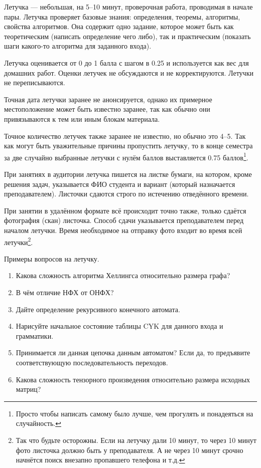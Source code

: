 Летучка --- небольшая, на 5--10 минут, проверочная работа, проводимая в начале пары. 
Летучка проверяет базовые знания: определения, теоремы, алгоритмы, свойства алгоритмов. 
Она содержит одно задание, которое может быть как теоретическим (написать определение чего либо), так и практическим (показать шаги какого-то алгоритма для заданного входа).

Летучка оценивается от 0 до 1 балла с шагом в 0.25 и используется как вес для домашних работ. Оценки летучек не обсуждаются и не корректируются. Летучки не переписываются.

Точная дата летучки заранее не анонсируется, однако их примерное местоположение может быть известно заранее, так как обычно они привязываются к тем или иным блокам материала.

Точное количество летучек также заранее не известно, но обычно это 4--5. Так как могут быть уважительные причины пропустить летучку, то в конце семестра за две случайно выбранные летучки с нулём баллов выставляется 0.75 баллов\footnote{Просто чтобы написать самому было лучше, чем прогулять и понадеяться на случайность.}. 

При занятиях в аудитории летучка пишется на листке бумаги, на котором, кроме решения задач, указывается ФИО студента и вариант (который назначается преподавателем). Листочки сдаются строго по истечению отведённого времени.

При занятии в удалённом формате всё происходит точно также, только сдаётся фотография (скан) листочка. Способ сдачи указывается преподавателем перед началом летучки. Время необходимое на отправку фото входит во время всей летучки\footnote{Так что будьте осторожны. Если на летучку дали 10 минут, то через 10 минут фото листочка должно быть у преподавателя. А не через 10 минут срочно начнётся поиск внезапно пропавшего телефона и т.д.}.

Примеры вопросов на летучку.
\begin{enumerate}
    \item Какова сложность алгоритма Хеллингса относительно размера графа?
    \item В чём отличие НФХ от ОНФХ?
    \item Дайте определение рекурсивного конечного автомата.
    \item Нарисуйте начальное состояние таблицы CYK для данного входа и грамматики.
    \item Принимается ли данная цепочка данным автоматом? Если да, то предъявите соответствующую последовательность переходов.
    \item Какова сложность тензорного произведения относительно размера исходных матриц?
\end{enumerate}